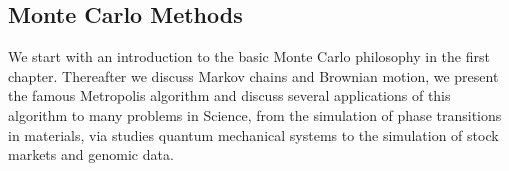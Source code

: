 % 
%
%

\begin{partbacktext}
\part{Monte Carlo Methods}
We start with an introduction to the basic Monte Carlo philosophy in the first chapter. Thereafter we discuss Markov chains and Brownian motion, we present the famous  Metropolis algorithm and discuss several applications of this algorithm to many problems in Science, from the simulation of phase transitions in materials, via studies quantum mechanical systems  to the simulation of stock markets and genomic data. 
\end{partbacktext}
